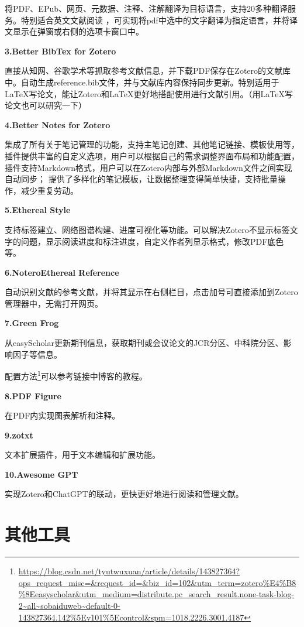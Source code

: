 \documentclass[]{ctexbook}
\renewcommand{\href}[2]{#2\footnote{\url{#1}}}
\theoremstyle{definition}
\theoremstyle{definition}
\theoremstyle{definition}
\theoremstyle{definition}
\theoremstyle{remark}
\begin{document}
将PDF、EPub、网页、元数据、注释、注解翻译为目标语言，支持20多种翻译服务。特别适合英文文献阅读 ，可实现将pdf中选中的文字翻译为指定语言，并将译文显示在弹窗或右侧的选项卡窗口中。

\textbf{3.Better BibTex for Zotero}

直接从知网、谷歌学术等抓取参考文献信息，并下载PDF保存在Zotero的文献库中。自动生成reference.bib文件，并与文献库内容保持同步更新。特别适用于LaTeX写论文，能让Zotero和LaTeX更好地搭配使用进行文献引用。（用LaTeX写论文也可以研究一下）

\textbf{4.Better Notes for Zotero}

集成了所有关于笔记管理的功能，支持主笔记创建、其他笔记链接、模板使用等，插件提供丰富的自定义选项，用户可以根据自己的需求调整界面布局和功能配置，插件支持Markdown格式，用户可以在Zotero内部与外部Markdown文件之间实现自动同步； 提供了多样化的笔记模板，让数据整理变得简单快捷，支持批量操作，减少重复劳动。

\textbf{5.Ethereal Style}

支持标签建立、网络图谱构建、进度可视化等功能。可以解决Zotero不显示标签文字的问题，显示阅读进度和标注进度，自定义作者列显示格式，修改PDF底色等。

\textbf{6.NoteroEthereal Reference}

自动识别文献的参考文献，并将其显示在右侧栏目，点击加号可直接添加到Zotero管理器中，无需打开网页。

\textbf{7.Green Frog}

从easyScholar更新期刊信息，获取期刊或会议论文的JCR分区、中科院分区、影响因子等信息。

\href{https://blog.csdn.net/tyutwuxuan/article/details/143827364?ops_request_misc=&request_id=&biz_id=102&utm_term=zotero\%E4\%B8\%8Eeasyscholar&utm_medium=distribute.pc_search_result.none-task-blog-2~all~sobaiduweb~default-0-143827364.142\%5Ev101\%5Econtrol&spm=1018.2226.3001.4187}{配置方法}可以参考链接中博客的教程。

\textbf{8.PDF Figure}

在PDF内实现图表解析和注释。

\textbf{9.zotxt}

文本扩展插件，用于文本编辑和扩展功能。

\textbf{10.Awesome GPT}

实现Zotero和ChatGPT的联动，更快更好地进行阅读和管理文献。

\part{其他工具}\label{part-ux5176ux4ed6ux5de5ux5177}
\end{document}
